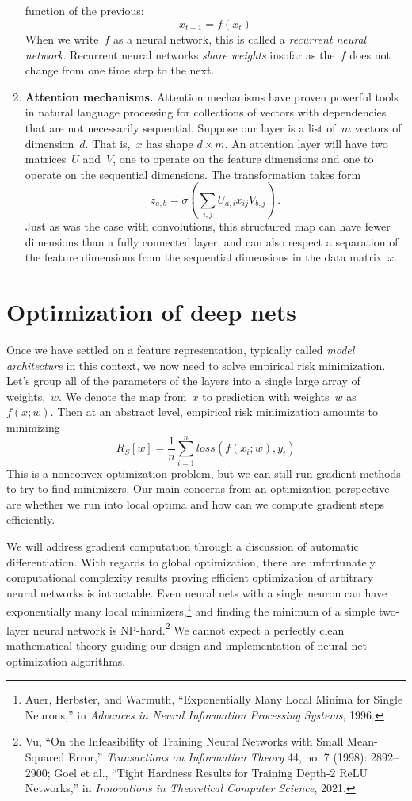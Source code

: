 \documentclass{tufte-book}
\begin{document}
\begin{enumerate}
  function of the previous: \[
   x_{t+1} = f(x_t)
  \] When we write~\(f\) as a neural network, this is called a
  \emph{recurrent neural network}. Recurrent neural networks \emph{share
  weights} insofar as the~\(f\) does not change from one time step to
  the next.
\item
  \textbf{Attention mechanisms.} Attention mechanisms have proven
  powerful tools in natural language processing for collections of
  vectors with dependencies that are not necessarily sequential. Suppose
  our layer is a list of~\(m\) vectors of dimension~\(d\). That
  is,~\(x\) has shape \(d\times m\). An attention layer will have two
  matrices~\(U\) and~\(V\), one to operate on the feature dimensions and
  one to operate on the sequential dimensions. The transformation takes
  form \[
   z_{a,b} = \sigma\left( \sum_{i,j} U_{a,i} x_{ij} V_{b,j} \right)\,.
  \] Just as was the case with convolutions, this structured map can
  have fewer dimensions than a fully connected layer, and can also
  respect a separation of the feature dimensions from the sequential
  dimensions in the data matrix~\(x\).
\end{enumerate}

\hypertarget{optimization-of-deep-nets}{%
\section{Optimization of deep nets}\label{optimization-of-deep-nets}}

Once we have settled on a feature representation, typically called
\emph{model architecture} in this context, we now need to solve
empirical risk minimization. Let's group all of the parameters of the
layers into a single large array of weights,~\(w\). We denote the map
from~\(x\) to prediction with weights~\(w\) as~\(f(x;w)\). Then at an
abstract level, empirical risk minimization amounts to minimizing \[
    R_S[w] = \frac{1}{n}\sum_{i=1}^n \mathit{loss}(f(x_i;w),y_i)
\] This is a nonconvex optimization problem, but we can still run
gradient methods to try to find minimizers. Our main concerns from an
optimization perspective are whether we run into local optima and how
can we compute gradient steps efficiently.

We will address gradient computation through a discussion of automatic
differentiation. With regards to global optimization, there are
unfortunately computational complexity results proving efficient
optimization of arbitrary neural networks is intractable. Even neural
nets with a single neuron can have exponentially many local
minimizers,\footnote{Auer, Herbster, and Warmuth, {``Exponentially Many
  Local Minima for Single Neurons,''} in \emph{Advances in Neural
  Information Processing Systems}, 1996.} and finding the minimum of a
simple two-layer neural network is NP-hard.\footnote{Vu, {``On the
  Infeasibility of Training Neural Networks with Small Mean-Squared
  Error,''} \emph{Transactions on Information Theory} 44, no. 7 (1998):
  2892--2900; Goel et al., {``Tight Hardness Results for Training
  Depth-2 ReLU Networks,''} in \emph{Innovations in Theoretical Computer
  Science}, 2021.} We cannot expect a perfectly clean mathematical
theory guiding our design and implementation of neural net optimization
algorithms.
\end{document}
